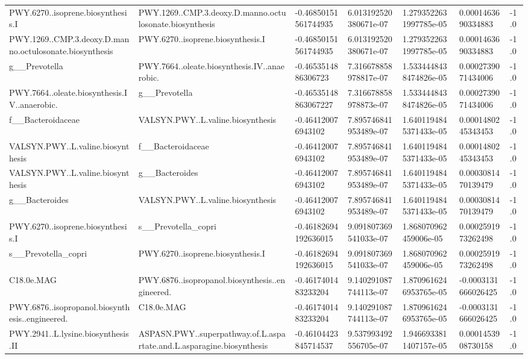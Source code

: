 \begin{longtable}{lllllll}
PWY.6270..isoprene.biosynthesis.I & PWY.1269..CMP.3.deoxy.D.manno.octulosonate.biosynthesis & -0.46850151561744935 & 6.013192520380671e-07 & 1.2793522631997785e-05 & 0.0001463690334883 & -1.0 \\
PWY.1269..CMP.3.deoxy.D.manno.octulosonate.biosynthesis & PWY.6270..isoprene.biosynthesis.I & -0.46850151561744935 & 6.013192520380671e-07 & 1.2793522631997785e-05 & 0.0001463690334883 & -1.0 \\
g\_\_Prevotella & PWY.7664..oleate.biosynthesis.IV..anaerobic. & -0.4653514886306723 & 7.316678858978817e-07 & 1.5334448438474826e-05 & 0.0002739071434006 & -1.0 \\
PWY.7664..oleate.biosynthesis.IV..anaerobic. & g\_\_Prevotella & -0.46535148863067227 & 7.316678858978873e-07 & 1.5334448438474826e-05 & 0.0002739071434006 & -1.0 \\
f\_\_Bacteroidaceae & VALSYN.PWY..L.valine.biosynthesis & -0.464120076943102 & 7.895746841953489e-07 & 1.6401194845371433e-05 & 0.0001480245343453 & -1.0 \\
VALSYN.PWY..L.valine.biosynthesis & f\_\_Bacteroidaceae & -0.464120076943102 & 7.895746841953489e-07 & 1.6401194845371433e-05 & 0.0001480245343453 & -1.0 \\
VALSYN.PWY..L.valine.biosynthesis & g\_\_Bacteroides & -0.464120076943102 & 7.895746841953489e-07 & 1.6401194845371433e-05 & 0.0003081470139479 & -1.0 \\
g\_\_Bacteroides & VALSYN.PWY..L.valine.biosynthesis & -0.464120076943102 & 7.895746841953489e-07 & 1.6401194845371433e-05 & 0.0003081470139479 & -1.0 \\
PWY.6270..isoprene.biosynthesis.I & s\_\_Prevotella\_copri & -0.46182694192636015 & 9.091807369541033e-07 & 1.868070962459006e-05 & 0.0002591973262498 & -1.0 \\
s\_\_Prevotella\_copri & PWY.6270..isoprene.biosynthesis.I & -0.46182694192636015 & 9.091807369541033e-07 & 1.868070962459006e-05 & 0.0002591973262498 & -1.0 \\
C18.0e.MAG & PWY.6876..isopropanol.biosynthesis..engineered. & -0.4617401483233204 & 9.140291087744113e-07 & 1.8709616246953765e-05 & -0.0003131666026425 & -1.0 \\
PWY.6876..isopropanol.biosynthesis..engineered. & C18.0e.MAG & -0.4617401483233204 & 9.140291087744113e-07 & 1.8709616246953765e-05 & -0.0003131666026425 & -1.0 \\
PWY.2941..L.lysine.biosynthesis.II & ASPASN.PWY..superpathway.of.L.aspartate.and.L.asparagine.biosynthesis & -0.46104423845714537 & 9.537993492556705e-07 & 1.9466933811407157e-05 & 0.0001453908730158 & -1.0 \\

\end{longtable}
